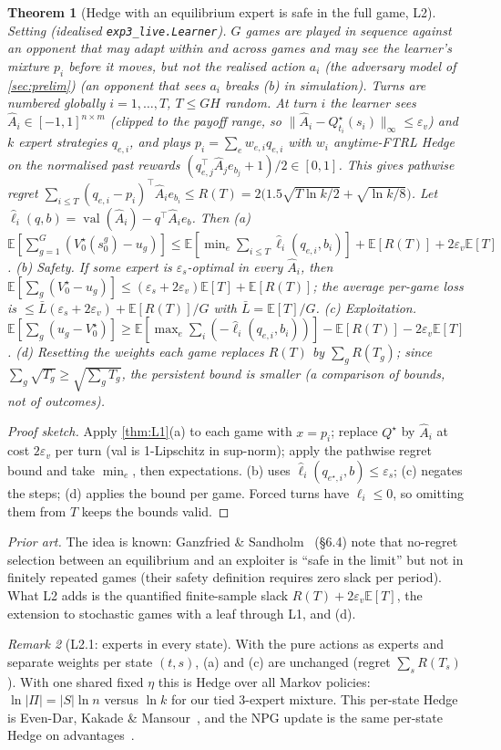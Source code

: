 \documentclass[10pt]{article}
\theoremstyle{plain}
\newtheorem{theorem}{Theorem}
\theoremstyle{definition}
\theoremstyle{remark}
\newtheorem{remark}[theorem]{Remark}
\newcommand{\E}{\mathbb{E}}
\newcommand{\epss}{\varepsilon_s}
\newcommand{\epsv}{\varepsilon_v}
\newcommand{\Ahat}{\hat A}
\DeclareMathOperator{\val}{val}
\begin{document}
\begin{theorem}[Hedge with an equilibrium expert is safe in the full game, L2]\label{thm:L2}
\emph{Setting (idealised \texttt{exp3\_live.Learner}).} $G$ games are played in sequence against an opponent that may adapt within and across games and may see the learner's mixture $p_i$ before it moves, \emph{but not the realised action $a_i$} (the adversary model of \cref{sec:prelim}) (an opponent that sees $a_i$ breaks (b) in simulation). Turns are numbered globally $i=1,\dots,T$, $T\le GH$ random. At turn $i$ the learner sees $\Ahat_i\in[-1,1]^{n\times m}$ (clipped to the payoff range, so $\lVert\Ahat_i-Q^\star_{t_i}(s_i)\rVert_\infty\le\epsv$) and $k$ expert strategies $q_{e,i}$, and plays $p_i=\sum_ew_{e,i}q_{e,i}$ with $w_i$ anytime-FTRL Hedge on the \emph{normalised} past rewards $(q_{e,j}^\top\Ahat_je_{b_j}+1)/2\in[0,1]$. This gives pathwise regret $\sum_{i\le T}(q_{e,i}-p_i)^\top\Ahat_ie_{b_i}\le R(T)=2\big(1.5\sqrt{T\ln k/2}+\sqrt{\ln k/8}\big)$. Let $\hat\ell_i(q,b)=\val(\Ahat_i)-q^\top\Ahat_ie_b$. Then
(a) $\E[\sum_{g=1}^G(V^\star_0(s^g_0)-u_g)]\le\E[\min_e\sum_{i\le T}\hat\ell_i(q_{e,i},b_i)]+\E[R(T)]+2\epsv\E[T]$.
(b) \emph{Safety.} If some expert is $\epss$-optimal in every $\Ahat_i$, then $\E[\sum_g(V^\star_0-u_g)]\le(\epss+2\epsv)\E[T]+\E[R(T)]$; the average per-game loss is $\le\bar L(\epss+2\epsv)+\E[R(T)]/G$ with $\bar L=\E[T]/G$.
(c) \emph{Exploitation.} $\E[\sum_g(u_g-V^\star_0)]\ge\E[\max_e\sum_i(-\hat\ell_i(q_{e,i},b_i))]-\E[R(T)]-2\epsv\E[T]$.
(d) Resetting the weights each game replaces $R(T)$ by $\sum_gR(T_g)$; since $\sum_g\sqrt{T_g}\ge\sqrt{\sum_gT_g}$, the persistent bound is smaller (a comparison of bounds, not of outcomes).
\end{theorem}
\begin{proof}[Proof sketch]
Apply \cref{thm:L1}(a) to each game with $x=p_i$; replace $Q^\star$ by $\Ahat_i$ at cost $2\epsv$ per turn (val is 1-Lipschitz in sup-norm); apply the pathwise regret bound and take $\min_e$, then expectations. (b) uses $\hat\ell_i(q_{e^\star,i},b)\le\epss$; (c) negates the steps; (d) applies the bound per game. Forced turns have $\ell_i\le0$, so omitting them from $T$ keeps the bounds valid.
\end{proof}
\emph{Prior art.} The idea is known: Ganzfried \& Sandholm~\cite{Gan15} (\S6.4) note that no-regret selection between an equilibrium and an exploiter is ``safe in the limit'' but not in finitely repeated games (their safety definition requires zero slack per period). What L2 adds is the quantified finite-sample slack $R(T)+2\epsv\E[T]$, the extension to stochastic games with a leaf through L1, and (d).
\begin{remark}[L2.1: experts in every state]
With the pure actions as experts and separate weights per state $(t,s)$, (a) and (c) are unchanged (regret $\sum_sR(T_s)$). With one shared fixed $\eta$ this is Hedge over all Markov policies: $\ln|\Pi|=|S|\ln n$ versus $\ln k$ for our tied 3-expert mixture. This per-state Hedge is Even-Dar, Kakade \& Mansour~\cite{EKM09}, and the NPG update is the same per-state Hedge on advantages~\cite{Aga21}.
\end{remark}
\end{document}
